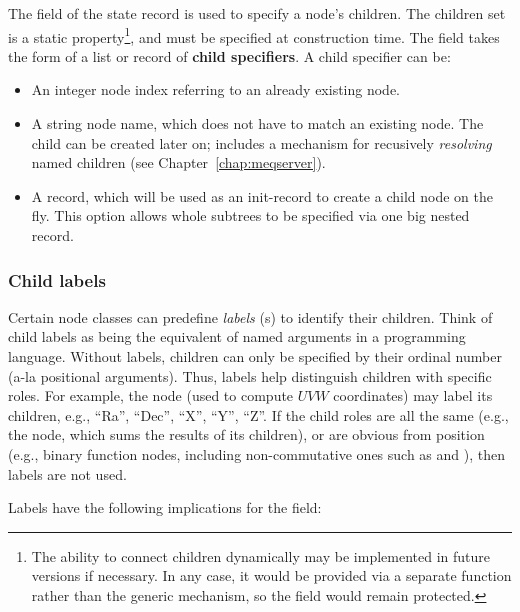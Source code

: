   The  field of the state record is used to specify a node's
  children. The children set is a static property\footnote{The ability to
  connect children dynamically may be implemented in future versions if
  necessary. In any case, it would be provided via a separate function rather
  than the generic  mechanism, so the  field would
  remain protected.}, and must be specified at construction time. The
   field takes the form of a list or record of {\bf child
  specifiers}. A child specifier can be:

  \begin{itemize}
  
  \item An integer node index referring to an already existing node.
  
  \item A string node name, which does not have to match an existing node. The
    child can be created later on;  includes a mechanism  for
    recusively {\em resolving} named children (see
    Chapter~\ref{chap:meqserver}).

  \item A record, which will be used as an init-record to create a child node on
    the fly. This option allows whole subtrees to be specified via one big
    nested record.
  
  \end{itemize}
  
  \subsubsection{Child labels}
  
  Certain node classes can predefine {\em labels} (s) to identify their
  children. Think of child labels as being the equivalent of named arguments in
  a programming language. Without labels, children can only be specified by
  their ordinal number (a-la positional arguments). Thus, labels help
  distinguish children with specific roles. For example, the  node
  (used to compute $UVW$ coordinates) may label its children, e.g., ``Ra'',
  ``Dec'', ``X'', ``Y'', ``Z''. If the child roles are all the same (e.g.,
  the  node, which sums the results of its children), or are obvious
  from position (e.g., binary function nodes, including non-commutative ones
  such as  and ), then labels are not used.
  
  Labels have the following implications for the  field:
  
